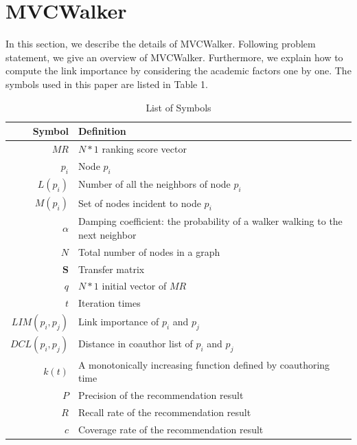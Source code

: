 \documentclass[10pt,journal,compsoc]{IEEEtran}
\begin{document}
\section{MVCWalker}
In this section, we describe the details of MVCWalker. Following problem statement, we give an overview of MVCWalker. Furthermore, we explain how to compute the link importance by considering the academic factors one by one. The symbols used in this paper are listed in Table 1.
\begin{table}
\renewcommand{\arraystretch}{1.2}
\caption{List of Symbols}
\label{tab:1}
\begin{tabular*}{3.5in}{@{\extracolsep{\fill}}r| l}
\hline
Symbol & Definition  \\
\hline
$MR$	           & \multirow{1}{2.8in}{$N\ast1$ ranking score vector}	                             \\
$p_{i}$            & \multirow{1}{2.8in}{Node $p_{i}$} 	                      \\
$L(p_{i})$	           & \multirow{1}{2.8in}{Number of all the neighbors of node $p_{i}$}                           \\
$M(p_{i})$	           & \multirow{1}{2.8in}{Set of nodes incident to node $p_{i}$}             \\
\multirow{2}{*}{$\alpha$}	  & \multirow{2}{2.8in}{Damping coefficient: the probability of a walker walking to the next neighbor}                        \\
~~	   & ~~                       \\
$N$	   & \multirow{1}{2.8in}{Total number of nodes in a graph}    \\
$\mathbf{S}$	   & \multirow{1}{2.8in}{Transfer matrix}   \\
$q$	   & \multirow{1}{2.8in}{$N\ast1$ initial vector of $MR$}	                                     \\
$t$  & \multirow{1}{2.8in}{Iteration times}  \\
$LIM(p_{i}, p_{j})$  & \multirow{1}{2.8in}{Link importance of $p_{i}$ and $p_{j}$}               \\
$DCL(p_{i}, p_{j})$  & \multirow{1}{2.8in}{Distance in coauthor list of $p_{i}$ and $p_{j}$ }	                 \\
\multirow{2}{*}{$k(t)$}	   & \multirow{2}{2.8in}{A monotonically increasing function defined by coauthoring time}                \\
~~	   & ~~                       \\
$P$	   & \multirow{1}{2.8in}{Precision of the recommendation result}                      \\
$R$	   & \multirow{1}{2.8in}{Recall rate of the recommendation result}	                                                 \\
$c$    & \multirow{1}{2.8in}{Coverage rate of the recommendation result}	                                             \\
\hline
\end{tabular*}
\end{table}
\end{document}
